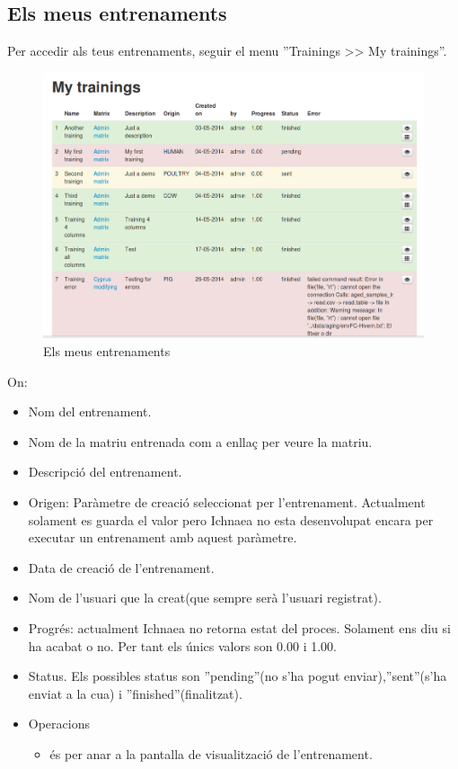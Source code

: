 \subsection{Els meus entrenaments}
\label{subsec:myTrainings}
Per accedir als teus entrenaments, seguir el menu ''Trainings >> My trainings''.
\begin{figure}[h!]
  \centering
  \includegraphics[scale=0.4]{img/userguide/my_trainings.png}
  \caption{Els meus entrenaments}
  \label{fig:my_trainings}
\end{figure}
On:
\begin{itemize}
\item Nom del entrenament.
\item Nom de la matriu entrenada com a enllaç per veure la matriu.
\item Descripci\'{o} del entrenament.
\item Origen: Paràmetre de creació seleccionat per l'entrenament. Actualment solament es guarda el valor pero Ichnaea no esta desenvolupat encara per executar un entrenament amb aquest paràmetre.
\item Data de creaci\'{o} de l'entrenament.
\item Nom de l'usuari que la creat(que sempre serà l'usuari registrat).
\item Progr\'{e}s: actualment Ichnaea no retorna estat del proces. Solament ens diu si ha acabat o no. Per tant els \'{u}nics valors son 0.00 i 1.00.
\item Status. Els possibles status son ''pending''(no s'ha pogut enviar),''sent''(s'ha enviat a la cua) i ''finished''(finalitzat). 
\item Operacions
 \begin{itemize}
 \item \iconeyeopen \'{e}s per anar a la pantalla de visualització de l'entrenament.
 \end{itemize}
\end{itemize}

